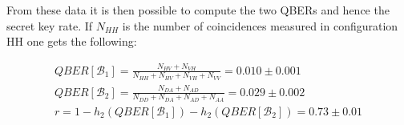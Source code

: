 \documentclass[a4paper, 11pt]{article}
\begin{document}
      From these data it is then possible to compute the two QBERs and hence the secret key rate. If $N_{HH}$ is the number of coincidences measured in configuration HH one gets the following:

      \begin{gather*}
        QBER[\mathcal{B}_1] = \frac{N_{HV} + N_{VH}}{N_{HH} + N_{HV} + N_{VH} + N_{VV}} =  0.010 \pm 0.001 \\
        QBER[\mathcal{B}_2] = \frac{N_{DA} + N_{AD}}{N_{DD} + N_{DA} + N_{AD} + N_{AA}} = 0.029 \pm 0.002 \\
        r = 1 - h_2(QBER[\mathcal{B}_1]) - h_2(QBER[\mathcal{B}_2]) = 0.73 \pm 0.01
      \end{gather*}
\end{document}
